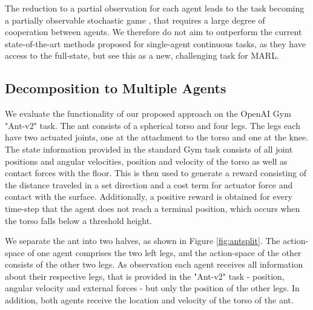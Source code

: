\documentclass{article}
\begin{document}
The reduction to a partial observation for each agent leads to the task becoming a partially observable stochastic game \cite{Hansen2004}, that requires a large degree of cooperation between agents.
We therefore do not aim to outperform the current state-of-the-art methods proposed for single-agent continuous tasks, as they have access to the full-state, but see this as a new, challenging task for \gls*{MARL}.

\vspace{-1.5mm}
\subsection{Decomposition to Multiple Agents}
\vspace{-1.5mm}
We evaluate the functionality of our proposed approach on the OpenAI Gym \cite{gym} "Ant-v2" task.
The ant consists of a spherical torso and four legs.
The legs each have two actuated joints, one at the attachment to the torso and one at the knee.
The state information provided in the standard Gym task consists of all joint positions and angular velocities, position and velocity of the torso as well as contact forces with the floor.
This is then used to generate a reward consisting of the distance traveled in a set direction and a cost term for actuator force and contact with the surface.
Additionally, a positive reward is obtained for every time-step that the agent does not reach a terminal position, which occurs when the torso falls below a threshold height.

We separate the ant into two halves, as shown in Figure \ref{fig:antsplit}.
The action-space of one agent comprises the two left legs, and the action-space of the other consists of the other two legs.
As observation each agent receives all information about their respective legs, that is provided in the "Ant-v2" task - position, angular velocity and external forces - but only the position of the other legs.
In addition, both agents receive the location and velocity of the torso of the ant.
\end{document}
